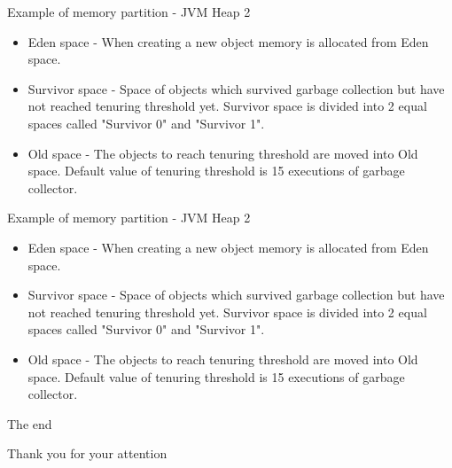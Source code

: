 \documentclass[presentation]{beamer}
\begin{document}
\begin{frame}{Example of memory partition - JVM Heap 2}
	\begin{itemize}
		\item Eden space - When creating a new object memory is allocated from Eden space.
		\item Survivor space - Space of objects which survived garbage collection but have not reached tenuring threshold yet. Survivor space is divided into 2 equal spaces called "Survivor 0" and "Survivor 1".
		\item Old space - The objects to reach tenuring threshold are moved into Old space. Default value of tenuring threshold is 15 executions of garbage collector.
	\end{itemize}
\end{frame}

\begin{frame}{Example of memory partition - JVM Heap 2}
\begin{itemize}
	\item Eden space - When creating a new object memory is allocated from Eden space.
	\item Survivor space - Space of objects which survived garbage collection but have not reached tenuring threshold yet. Survivor space is divided into 2 equal spaces called "Survivor 0" and "Survivor 1".
	\item Old space - The objects to reach tenuring threshold are moved into Old space. Default value of tenuring threshold is 15 executions of garbage collector.
\end{itemize}
\end{frame}

\begin{frame}{The end}
\begin{center}
Thank you for your attention
\end{center}
\end{frame}
\end{document}
